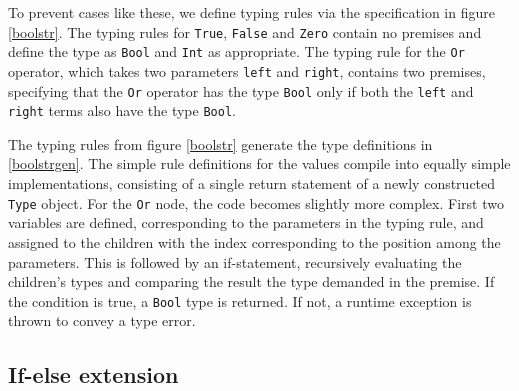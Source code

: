 \documentclass[nofilelist]{cslthse-msc}
\begin{document}
To prevent cases like these, we define typing rules via the specification in figure \ref{boolstr}.
The typing rules for \verb|True|, \verb|False| and \verb|Zero| contain no premises and define the type as \verb|Bool| and \verb|Int| as appropriate.
The typing rule for the \verb|Or| operator, which takes two parameters \verb|left| and \verb|right|, contains two premises, specifying that the \verb|Or| operator has the type \verb|Bool| only if both the \verb|left| and \verb|right| terms also have the type \verb|Bool|.

The typing rules from figure \ref{boolstr} generate the type definitions in \ref{boolstrgen}.
The simple rule definitions for the values compile into equally simple implementations, consisting of a single return statement of a newly constructed \verb|Type| object.
For the \verb|Or| node, the code becomes slightly more complex.
First two variables are defined, corresponding to the parameters in the typing rule, and assigned to the children with the index corresponding to the position among the parameters.
This is followed by an if-statement, recursively evaluating the children's types and comparing the result the type demanded in the premise.
If the condition is true, a \verb|Bool| type is returned.
If not, a runtime exception is thrown to convey a type error.

\subsection{If-else extension}
\end{document}
